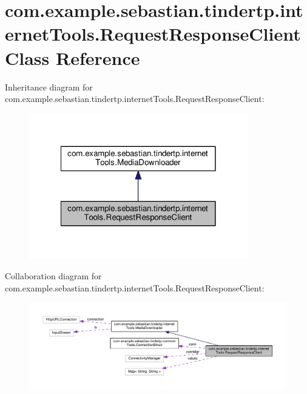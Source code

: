 \hypertarget{classcom_1_1example_1_1sebastian_1_1tindertp_1_1internetTools_1_1RequestResponseClient}{}\section{com.\+example.\+sebastian.\+tindertp.\+internet\+Tools.\+Request\+Response\+Client Class Reference}
\label{classcom_1_1example_1_1sebastian_1_1tindertp_1_1internetTools_1_1RequestResponseClient}


Inheritance diagram for com.\+example.\+sebastian.\+tindertp.\+internet\+Tools.\+Request\+Response\+Client\+:\nopagebreak
\begin{figure}[H]
\begin{center}
\leavevmode
\includegraphics[width=270pt]{classcom_1_1example_1_1sebastian_1_1tindertp_1_1internetTools_1_1RequestResponseClient__inherit__graph}
\end{center}
\end{figure}


Collaboration diagram for com.\+example.\+sebastian.\+tindertp.\+internet\+Tools.\+Request\+Response\+Client\+:\nopagebreak
\begin{figure}[H]
\begin{center}
\leavevmode
\includegraphics[width=350pt]{classcom_1_1example_1_1sebastian_1_1tindertp_1_1internetTools_1_1RequestResponseClient__coll__graph}
\end{center}
\end{figure}
